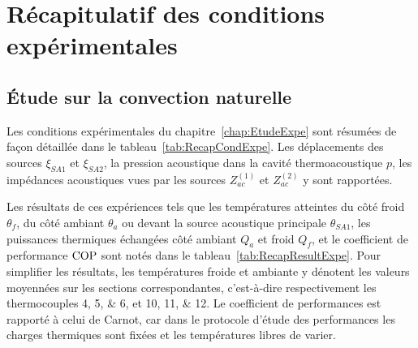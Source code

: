 \chapter{Récapitulatif des conditions expérimentales}
\section{\'Etude sur la convection naturelle}
Les conditions expérimentales du chapitre~\ref{chap:EtudeExpe} sont résumées de façon détaillée dans le tableau~\ref{tab:RecapCondExpe}. Les déplacements des sources $\xi_{SA1}$ et $\xi_{SA2}$, la pression acoustique dans la cavité thermoacoustique $p$, les impédances acoustiques vues par les sources $Z_{ac}^{(1)}$ et $Z_{ac}^{(2)}$ y sont rapportées.

Les résultats de ces expériences tels que les températures atteintes du côté froid $\theta_f$, du côté ambiant $\theta_a$ ou devant la source acoustique principale $\theta_{SA1}$, les puissances thermiques échangées côté ambiant $Q_a$ et froid $Q_f$, et le coefficient de performance $\mathrm{COP}$ sont notés dans le tableau~\ref{tab:RecapResultExpe}. Pour simplifier les résultats, les températures froide et ambiante y dénotent les valeurs moyennées sur les sections correspondantes, c'est-à-dire respectivement les thermocouples \numlist{4;5;6}, et \numlist{10;11;12}. Le coefficient de performances est rapporté à celui de Carnot, car dans le protocole d'étude des performances les charges thermiques sont fixées et les températures libres de varier.

